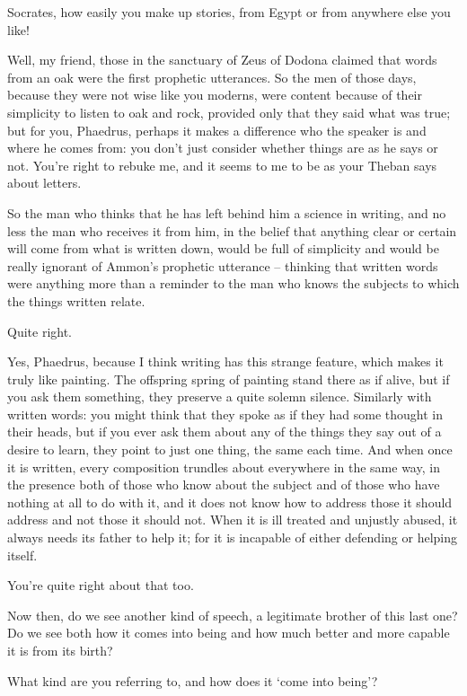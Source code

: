 Socrates, how easily you make up stories, from Egypt or from
anywhere else you like!

 Well, my friend, those in the sanctuary of Zeus of
Dodona claimed that words from an oak were the first prophetic
utterances. So the men of those days, because they were not wise like
you moderns, were content because of their simplicity to listen to oak
and rock, provided only
that they said  what was true; but for you, Phaedrus, perhaps it
makes a difference who the speaker is and where he comes from: you don't
just consider whether things are as he says or not. You're
right to rebuke me, and it seems to me to be as your Theban says about
letters.

So the man who thinks that he has left behind him  a
science in writing, and no less the man who receives it from him, in the
belief that anything clear or certain will come from what is written
down, would be full of simplicity and would be really ignorant of
Ammon's prophetic utterance -- thinking that written words were anything
more than a reminder to the man  who knows the subjects to which
the things written relate.

Quite right.

Yes, Phaedrus, because I think writing has this strange
feature, which makes it truly like painting. The offspring 
spring of painting stand there as if alive, but if you ask them
something, they preserve a quite solemn silence. Similarly with written
words: you might think that they spoke as if they had some thought in
their heads, but if you ever ask them about any of the things they say
out of a desire to learn, they point to just one thing, the same each
time. And when once it is written,  every composition trundles
about everywhere in the same way, in the presence both of those who know
about the subject and of those who have nothing at all to do with it,
and it does not know how to address those it should address and not
those it should not. When it is ill treated and unjustly abused, it
always needs its father to help it; for it is incapable of either
defending  or helping itself.

You're quite right about that too.

Now then, do we see another kind of
speech, a 
legitimate brother of this last one? Do we see both how it comes into
being and how much better and more capable it is from its birth?

What kind are you referring to, and how does it ‘come into
being'?

